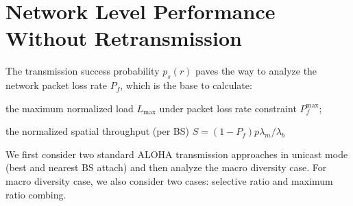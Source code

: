 \section{Network Level Performance Without Retransmission}
\label{sec:op_over_infinite_plane}
The transmission success probability $p_s(r)$ paves the way to analyze the network packet loss rate $P_{f}$, which is the base to calculate:\begin{inparaenum}[1)]
	\item the maximum normalized load $L_{\text{max}}$ under packet loss rate constraint $P_{f}^{\text{max}}$;
	\item the normalized spatial throughput (per BS) $S = (1-P_{f}) p\lambda_{m}/ \lambda_{b}$
\end{inparaenum}
We first consider two standard ALOHA transmission approaches in unicast mode (best and nearest BS attach) and then analyze the macro diversity case. For macro diversity case, we also consider two cases: selective ratio and maximum ratio combing.
